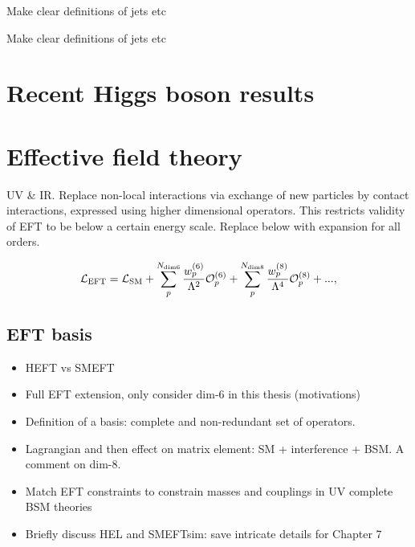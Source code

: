 \begin{table}[htb!]
    \caption[VH leptonic STXS stage 1.2 definitions and fractions]{Make clear definitions of jets etc}
    \label{tab:vh_definitions}
    \centering
    \scriptsize
    \renewcommand{\arraystretch}{1.2}
    \setlength{\tabcolsep}{5pt}
    \hspace*{-5cm}
    
    \hspace*{-5cm}
\end{table}

\begin{table}[htb!]
    \caption[Top-associated and bbH STXS stage 1.2 definitions and fractions]{Make clear definitions of jets etc}
    \label{tab:top_definitions}
    \centering
    \scriptsize
    \renewcommand{\arraystretch}{1.5}
    \setlength{\tabcolsep}{5pt}
    \hspace*{-5cm}
    
    \hspace*{-5cm}
\end{table}

\section{Recent Higgs boson results}

\section{Effective field theory}\label{sec:theory_eft}

UV & IR. Replace non-local interactions via exchange of new particles by contact interactions, expressed using higher dimensional operators. This restricts validity of EFT to be below a certain energy scale. Replace below with expansion for all orders.

\begin{equation}\label{eq:eft_expansion}
    \mathcal{L}_{\rm{EFT}} = \mathcal{L}_{\rm{SM}} + \sum^{N_{\rm{dim6}}}_p \frac{w^{(6)}_p}{\Lambda^2}\mathcal{O}^{(6)}_p + \sum^{N_{\rm{dim8}}}_p \frac{w^{(8)}_p}{\Lambda^4}\mathcal{O}^{(8)}_p + ... ,
\end{equation}

\subsection{EFT basis}
\begin{itemize}
    \item HEFT vs SMEFT
    \item Full EFT extension, only consider dim-6 in this thesis (motivations)
    \item Definition of a basis: complete and non-redundant set of operators.
    \item Lagrangian and then effect on matrix element: SM + interference + BSM. A comment on dim-8.
    \item Match EFT constraints to constrain masses and couplings in UV complete BSM theories
    \item Briefly discuss HEL and SMEFTsim: save intricate details for Chapter 7
\end{itemize}